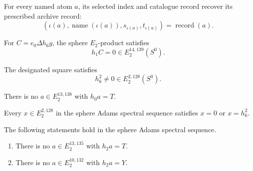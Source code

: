 \begin{theorem}
\label{frontier:E2Computation:2ab64b6c8429}
For every named atom $a$, its selected index and catalogue record recover its prescribed archive record:
\[(\iota(a),\operatorname{name}(\iota(a)),s_{\iota(a)},t_{\iota(a)})=\operatorname{record}(a).\]
\end{theorem}

\begin{theorem}
\label{frontier:E2Computation:6b059d10e824}
For $C=e_0\Delta h_6g$, the sphere $E_2$-product satisfies
\[h_1C=0\in E_2^{14,139}(S^0).\]
\end{theorem}

\begin{theorem}
\label{frontier:E2Computation:8116dddd2cea}
The designated square satisfies
\[h_6^2\ne0\in E_2^{2,128}(S^0).\]
\end{theorem}

\begin{theorem}
\label{frontier:E2Computation:9a558822725b}
There is no $a\in E_2^{13,138}$ with $h_0a=T$.
\end{theorem}

\begin{theorem}
\label{frontier:E2Computation:37381227a3a8}
Every $x\in E_2^{2,128}$ in the sphere Adams spectral sequence satisfies $x=0$ or $x=h_6^2$.
\end{theorem}

\begin{theorem}[Nondivisibility by $h_2$ on E2]
\label{frontier:E2Computation:3a36ab1c8384}
The following statements hold in the sphere Adams spectral sequence.
\begin{enumerate}
\item There is no $a\in E_2^{13,135}$ with $h_2a=T$.
\item There is no $a\in E_2^{10,132}$ with $h_2a=Y$.
\end{enumerate}
\end{theorem}

